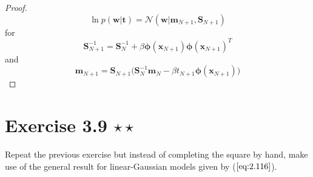 \begin{proof}
\begin{equation*}
        \ln p(\mathbf{w} | \mathbf{t}) = \mathcal{N}(\mathbf{w} | \mathbf{m}_{N + 1}, \mathbf{S}_{N + 1})
    \end{equation*}
    for
    \begin{equation}\label{eq:3.8.2}\tag{3.8.2}
        \mathbf{S}_{N + 1}^{-1}
        = \mathbf{S}_N^{-1} + \beta \bm{\phi}(\mathbf{x}_{N + 1})\bm{\phi}(\mathbf{x}_{N + 1})^T
    \end{equation}
    and
    \begin{equation*}
        \mathbf{m}_{N + 1}
        = \mathbf{S}_{N + 1}\big(\mathbf{S}_N^{-1} \mathbf{m}_N 
             - \beta t_{N + 1} \bm{\phi}(\mathbf{x}_{N + 1})\big)
    \end{equation*}
\end{proof}

\section*{Exercise 3.9 $\star \star$}
Repeat the previous exercise but instead of completing the square by hand,
make use of the general result for linear-Gaussian models given by 
($\ref{eq:2.116}$).

\vspace{1em}

